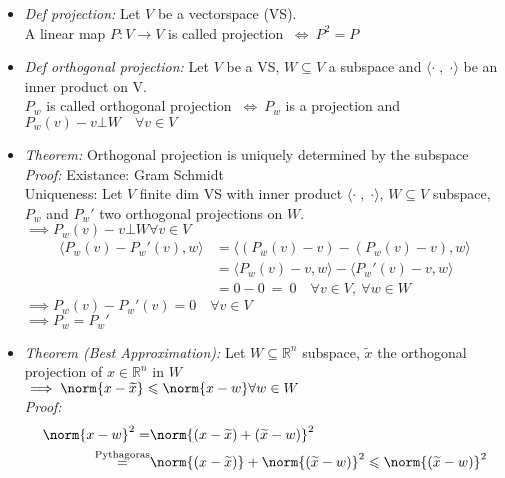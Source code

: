 \begin{SolutionSheet}[\ref{sheet1}]
  \begin{Solution}
    \begin{itemize}
      \item \textit{Def projection:} Let $V$ be a vectorspace (VS). \\
        A linear map $P: V \to V$ is called projection $\ \iff \ P^2 = P$
      \item \textit{Def orthogonal projection:} Let $V$ be a VS, $W \subseteq V$ a subspace 
        and $\langle \cdot \; , \; \cdot \rangle$ be an inner product on V. \\
        $P_w$ is called orthogonal projection $\ \iff \ P_w$ is a projection and 
        $P_w(v)-v \bot W \quad \forall v\in V$
      \item \textit{Theorem:} Orthogonal projection is uniquely determined by the subspace \\
        \textit{Proof:} Existance: Gram Schmidt \\
        Uniqueness: Let $V$ finite dim VS with inner product $\langle \cdot \; , \; \cdot \rangle$,
        $W \subseteq V$ subspace, $P_w$ and $P_w'$ two orthogonal projections on $W$. \\
        $\implies P_w(v)-v \bot W \forall v \in V$ 
        \begin{align*}
          \langle P_w(v) - P_w'(v), w \rangle &= \langle (P_w(v) - v) - (P_w(v) - v), w \rangle \\
          &= \langle P_w(v) - v , w \rangle - \langle P_w'(v) - v , w \rangle \\
          &= 0 - 0 \ = \ 0 \quad \forall v\in V, \ \forall w\in W
        \end{align*}
        $\implies P_w(v) - P_w'(v) = 0 \quad \forall v \in V$ \\
        $\implies P_w = P_w'$
      \item \textit{Theorem (Best Approximation):} Let $W \subseteq \mathbb{R}^n$ subspace,
        $\widetilde{x}$ the orthogonal projection of $x \in \mathbb{R}^n$ in $W$ \\
        $\implies \norm{x - \widetilde{x}} \leqslant \norm{x - w} \forall w \in W$ \\
        \textit{Proof:}  
        \begin{align*}
          \norm{x - w}^2 = & \norm{(x - \widetilde{x}) + (\widetilde{x} - w)}^2 \\
          \stackrel{\text{Pythagoras}}{=} & \norm{(x - \widetilde{x})} + \norm{(\widetilde{x} - w)}^2
          \leqslant \norm{(\widetilde{x} - w)}^2

\end{align*}
\end{itemize}
\end{Solution}
\end{SolutionSheet}

